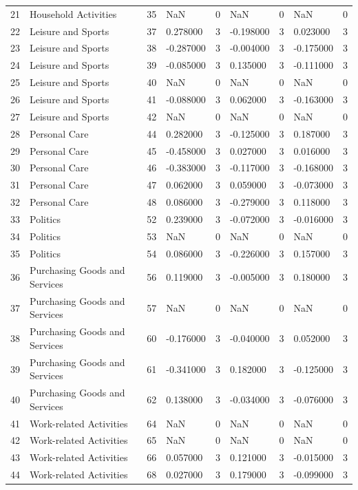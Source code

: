 \begin{tabular}{lllllllll}
21 & Household Activities & 35 & NaN & 0 & NaN & 0 & NaN & 0 \\
22 & Leisure and Sports & 37 & 0.278000 & 3 & -0.198000 & 3 & 0.023000 & 3 \\
23 & Leisure and Sports & 38 & -0.287000 & 3 & -0.004000 & 3 & -0.175000 & 3 \\
24 & Leisure and Sports & 39 & -0.085000 & 3 & 0.135000 & 3 & -0.111000 & 3 \\
25 & Leisure and Sports & 40 & NaN & 0 & NaN & 0 & NaN & 0 \\
26 & Leisure and Sports & 41 & -0.088000 & 3 & 0.062000 & 3 & -0.163000 & 3 \\
27 & Leisure and Sports & 42 & NaN & 0 & NaN & 0 & NaN & 0 \\
28 & Personal Care & 44 & 0.282000 & 3 & -0.125000 & 3 & 0.187000 & 3 \\
29 & Personal Care & 45 & -0.458000 & 3 & 0.027000 & 3 & 0.016000 & 3 \\
30 & Personal Care & 46 & -0.383000 & 3 & -0.117000 & 3 & -0.168000 & 3 \\
31 & Personal Care & 47 & 0.062000 & 3 & 0.059000 & 3 & -0.073000 & 3 \\
32 & Personal Care & 48 & 0.086000 & 3 & -0.279000 & 3 & 0.118000 & 3 \\
33 & Politics & 52 & 0.239000 & 3 & -0.072000 & 3 & -0.016000 & 3 \\
34 & Politics & 53 & NaN & 0 & NaN & 0 & NaN & 0 \\
35 & Politics & 54 & 0.086000 & 3 & -0.226000 & 3 & 0.157000 & 3 \\
36 & Purchasing Goods and Services & 56 & 0.119000 & 3 & -0.005000 & 3 & 0.180000 & 3 \\
37 & Purchasing Goods and Services & 57 & NaN & 0 & NaN & 0 & NaN & 0 \\
38 & Purchasing Goods and Services & 60 & -0.176000 & 3 & -0.040000 & 3 & 0.052000 & 3 \\
39 & Purchasing Goods and Services & 61 & -0.341000 & 3 & 0.182000 & 3 & -0.125000 & 3 \\
40 & Purchasing Goods and Services & 62 & 0.138000 & 3 & -0.034000 & 3 & -0.076000 & 3 \\
41 & Work-related Activities & 64 & NaN & 0 & NaN & 0 & NaN & 0 \\
42 & Work-related Activities & 65 & NaN & 0 & NaN & 0 & NaN & 0 \\
43 & Work-related Activities & 66 & 0.057000 & 3 & 0.121000 & 3 & -0.015000 & 3 \\
44 & Work-related Activities & 68 & 0.027000 & 3 & 0.179000 & 3 & -0.099000 & 3 \\
\bottomrule
\end{tabular}
